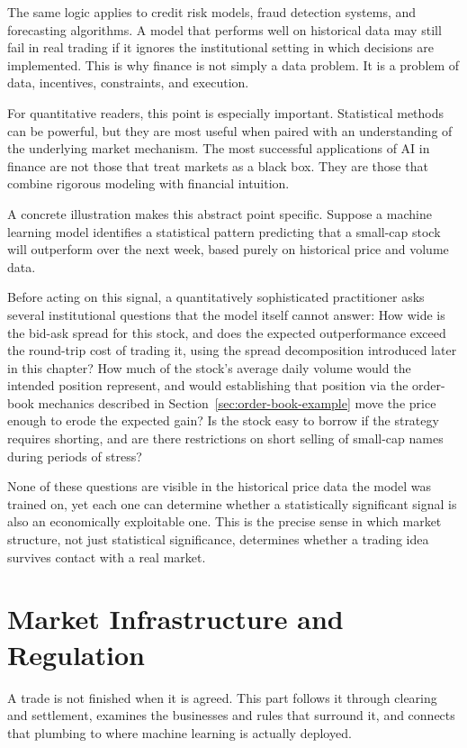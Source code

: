 \documentclass[../ai_in_finance]{subfiles}
\begin{document}
The same logic applies to credit risk models, fraud detection systems, and forecasting algorithms. A model that performs well on historical data may still fail in real trading if it ignores the institutional setting in which decisions are implemented. This is why finance is not simply a data problem. It is a problem of data, incentives, constraints, and execution.

For quantitative readers, this point is especially important. Statistical methods can be powerful, but they are most useful when paired with an understanding of the underlying market mechanism. The most successful applications of AI in finance are not those that treat markets as a black box. They are those that combine rigorous modeling with financial intuition.

A concrete illustration makes this abstract point specific. Suppose a machine learning model identifies a statistical pattern predicting that a small-cap stock will outperform over the next week, based purely on historical price and volume data.

Before acting on this signal, a quantitatively sophisticated practitioner asks several institutional questions that the model itself cannot answer: How wide is the bid-ask spread for this stock, and does the expected outperformance exceed the round-trip cost of trading it, using the spread decomposition introduced later in this chapter? How much of the stock's average daily volume would the intended position represent, and would establishing that position via the order-book mechanics described in Section~\ref{sec:order-book-example} move the price enough to erode the expected gain? Is the stock easy to borrow if the strategy requires shorting, and are there restrictions on short selling of small-cap names during periods of stress?

None of these questions are visible in the historical price data the model was trained on, yet each one can determine whether a statistically significant signal is also an economically exploitable one. This is the precise sense in which market structure, not just statistical significance, determines whether a trading idea survives contact with a real market.

\section{Market Infrastructure and Regulation}

A trade is not finished when it is agreed. This part follows it through clearing and settlement, examines the businesses and rules that surround it, and connects that plumbing to where machine learning is actually deployed.
\end{document}
